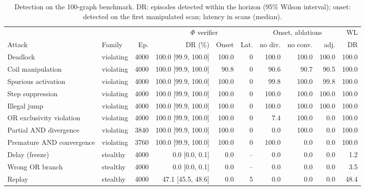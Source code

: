 \begin{table}[t]
\centering
\caption{Detection on the 100-graph benchmark. DR: episodes detected within the horizon (95\% Wilson interval); onset: detected on the first manipulated scan; latency in scans (median).}
\label{tab:detection}
\small
\begin{tabular}{llrrrrrrrr}
\toprule
 & & & \multicolumn{3}{c}{$\Phi$ verifier} & \multicolumn{3}{c}{Onset, ablations} & WL \\
\cmidrule(lr){4-6}\cmidrule(lr){7-9}
Attack & Family & Ep. & DR (\%) & Onset & Lat. & no div. & no conv. & adj. & DR \\
\midrule
Deadlock & violating & 4000 & 100.0 [99.9, 100.0] & 100.0 & 0 & 100.0 & 100.0 & 100.0 & 100.0 \\
Coil manipulation & violating & 4000 & 100.0 [99.9, 100.0] & 90.8 & 0 & 90.6 & 90.7 & 90.5 & 100.0 \\
Spurious activation & violating & 4000 & 100.0 [99.9, 100.0] & 100.0 & 0 & 99.8 & 100.0 & 99.8 & 100.0 \\
Step suppression & violating & 4000 & 100.0 [99.9, 100.0] & 100.0 & 0 & 100.0 & 100.0 & 100.0 & 100.0 \\
Illegal jump & violating & 4000 & 100.0 [99.9, 100.0] & 100.0 & 0 & 100.0 & 100.0 & 100.0 & 100.0 \\
OR exclusivity violation & violating & 4000 & 100.0 [99.9, 100.0] & 100.0 & 0 & 7.4 & 100.0 & 0.0 & 100.0 \\
Partial AND divergence & violating & 3840 & 100.0 [99.9, 100.0] & 100.0 & 0 & 0.0 & 100.0 & 0.0 & 100.0 \\
Premature AND convergence & violating & 3760 & 100.0 [99.9, 100.0] & 100.0 & 0 & 100.0 & 0.0 & 0.0 & 100.0 \\
Delay (freeze) & stealthy & 4000 & 0.0 [0.0, 0.1] & 0.0 & -- & 0.0 & 0.0 & 0.0 & 1.2 \\
Wrong OR branch & stealthy & 4000 & 0.0 [0.0, 0.1] & 0.0 & -- & 0.0 & 0.0 & 0.0 & 3.5 \\
Replay & stealthy & 4000 & 47.1 [45.5, 48.6] & 0.0 & 5 & 0.0 & 0.0 & 0.0 & 48.4 \\
\bottomrule
\end{tabular}
\end{table}
